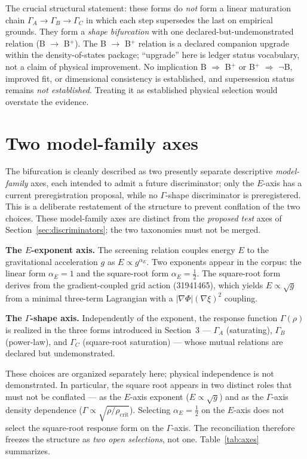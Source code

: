 \documentclass[11pt,a4paper]{article}
\begin{document}
The crucial structural statement: these forms do \emph{not} form a linear maturation chain $\Gamma_{A} \to \Gamma_{B} \to \Gamma_{C}$ in which each step supersedes the last on empirical grounds. They form a \emph{shape bifurcation} with one declared-but-undemonstrated relation (B $\to$ B$^{+}$). The B $\to$ B$^{+}$ relation is a declared companion upgrade within the density-of-states package; ``upgrade'' here is ledger status vocabulary, not a claim of physical improvement. No implication B $\Rightarrow$ B$^{+}$ or B$^{+}$ $\Rightarrow$ $\neg$B, improved fit, or dimensional consistency is established, and supersession status remains \emph{not established}. Treating it as established physical selection would overstate the evidence.

\section{Two model-family axes}
\label{sec:axes}

The bifurcation is cleanly described as two presently separate descriptive \emph{model-family} axes, each intended to admit a future discriminator; only the $E$-axis has a current preregistration proposal, while no $\Gamma$-shape discriminator is preregistered. This is a deliberate restatement of the structure to prevent conflation of the two choices. These model-family axes are distinct from the \emph{proposed test} axes of Section~\ref{sec:discriminators}; the two taxonomies must not be merged.

\textbf{The $E$-exponent axis.} The screening relation couples energy $E$ to the gravitational acceleration $g$ as $E \propto g^{\alpha_{E}}$. Two exponents appear in the corpus: the linear form $\alpha_{E} = 1$ and the square-root form $\alpha_{E} = \tfrac{1}{2}$. The square-root form derives from the gradient-coupled grid action (31941465), which yields $E \propto \sqrt{g}$ from a minimal three-term Lagrangian with a $|\nabla\Phi|(\nabla\xi)^{2}$ coupling.

\textbf{The $\Gamma$-shape axis.} Independently of the exponent, the response function $\Gamma(\rho)$ is realized in the three forms introduced in Section~3 --- $\Gamma_{A}$ (saturating), $\Gamma_{B}$ (power-law), and $\Gamma_{C}$ (square-root saturation) --- whose mutual relations are declared but undemonstrated.

These choices are organized separately here; physical independence is not demonstrated. In particular, the square root appears in two distinct roles that must not be conflated --- as the $E$-axis exponent ($E \propto \sqrt{g}$) and as the $\Gamma$-axis density dependence ($\Gamma \propto \sqrt{\rho/\rho_{\mathrm{crit}}}$). Selecting $\alpha_{E} = \tfrac{1}{2}$ on the $E$-axis does not select the square-root response form on the $\Gamma$-axis. The reconciliation therefore freezes the structure as \emph{two open selections}, not one. Table~\ref{tab:axes} summarizes.
\end{document}
